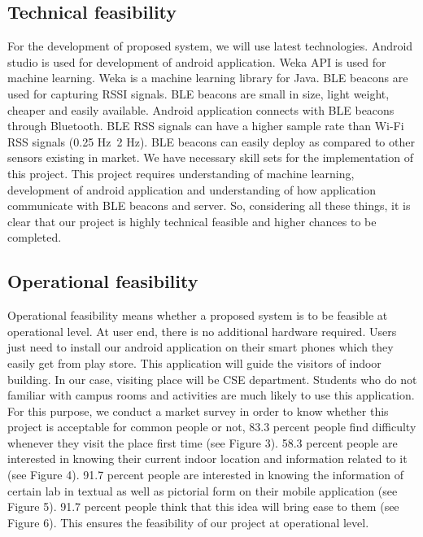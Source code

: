 \documentclass{article}
\begin{document}
\subsection{Technical feasibility}
For the development of proposed system, we will use latest technologies. Android studio is used for development of android application. Weka API is used for machine learning. Weka is a machine learning library for Java\cite{Weka}. BLE beacons are used for capturing RSSI signals. BLE beacons are small in size, light weight, cheaper and easily available. Android application\cite{android} connects with BLE beacons through Bluetooth. BLE RSS signals can have a higher sample rate than Wi-Fi RSS signals (0.25 Hz~2 Hz). BLE beacons can easily deploy as compared to other sensors existing in market. We have necessary skill sets for the implementation of this project. This project requires understanding of machine learning, development of android application and understanding of how application communicate with BLE beacons and server. So, considering all these things, it is clear that our project is highly technical feasible and higher chances to be completed.
\subsection{Operational feasibility}
Operational feasibility means whether a proposed system is to be feasible at operational level. At user end, there is no additional hardware required. Users just need to install our android application on their smart phones which they easily get from play store. This application will guide the visitors of indoor building. In our case, visiting place will be CSE department. Students who do not familiar with campus rooms and activities are much likely to use this application. For this purpose, we conduct a market survey in order to know whether this project is acceptable for common people or not, 83.3 percent people find difficulty whenever they visit the place first time (see Figure 3). 58.3 percent people are interested in knowing their current indoor location and information related to it (see Figure 4). 91.7 percent people are interested in knowing the information of certain lab in textual as well as pictorial form on their mobile application (see Figure 5). 91.7 percent people think that this idea will bring ease to them (see Figure 6). This ensures the feasibility of our project at operational level.
\\
\\
\end{document}
